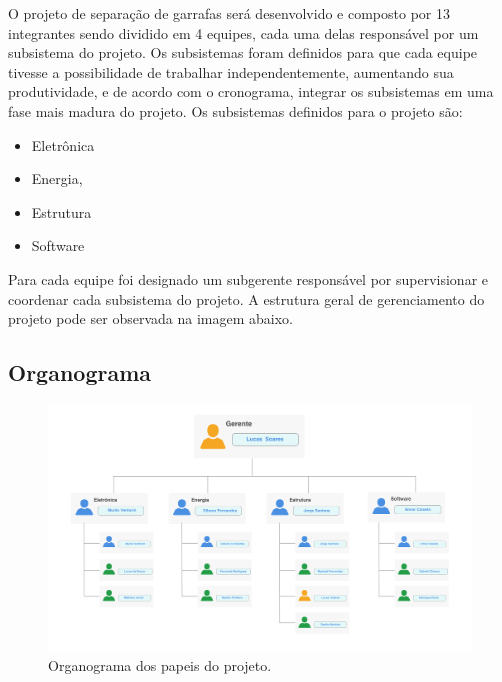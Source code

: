 O projeto de separação de garrafas será desenvolvido e composto por 13 integrantes sendo dividido em 4 equipes, cada uma delas responsável por um subsistema do projeto. Os subsistemas foram definidos para que cada equipe tivesse a possibilidade de trabalhar independentemente, aumentando sua produtividade, e de acordo com o cronograma, integrar os subsistemas em uma fase mais madura do projeto. Os subsistemas definidos para o projeto são:

\begin{itemize}
\item Eletrônica
\item Energia, 
\item Estrutura
\item Software
\end{itemize}

Para cada equipe foi designado um subgerente responsável por supervisionar e coordenar cada subsistema do projeto. A estrutura geral de gerenciamento do projeto pode ser observada na imagem abaixo.

\subsection{Organograma}

\begin{figure}[!ht]
	\centering
		\includegraphics[scale=0.1]{figuras/organograma}
	\caption{Organograma dos papeis do projeto.}
\end{figure}
